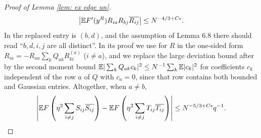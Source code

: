 \begin{proof}[Proof of Lemma \ref{lem: ex edge un}]
$$
\big|\mathbb{E} F'(y^R)R_{ia}R_{bj}\overline{R_{ij}}\big|\le N^{-4/3+C\epsilon}.
$$
In \cite{EKYY2} the replaced entry is $(b,d)$, and the assumption of Lemma 6.8 there should read ``$b,d,i,j$ are all distinct''. In its proof we use \cite[Lemma 6.10]{EKYY2} for $R$ in the one-sided form $R_{ia}=-R_{aa}\sum_kQ_{ak}R^{(a)}_{ki}$ ($i\ne a$), and we replace the large deviation bound after \cite[(6.97)]{EKYY2} by the second moment bound $\mathbb{E}|\sum_kQ_{ak}c_k|^2\le N^{-1}\sum_k\mathbb{E}|c_k|^2$ for coefficients $c_k$ independent of the row $a$ of $Q$ with $c_a=0$, since that row contains both bounded and Gaussian entries. Altogether, when $a\ne b$,
\begin{equation} \label{eq:S-T 1}
\left| \mathbb{E} F \left( \eta^2 \sum_{i \neq j} S_{ij} \overline{S_{ij}} \right) - \mathbb{E} F \left( \eta^2 \sum_{i \neq j} T_{ij} \overline{T_{ij}} \right) \right| \leq N^{-5/3 + C \epsilon} q^{-1}.
\end{equation}


\end{proof}
